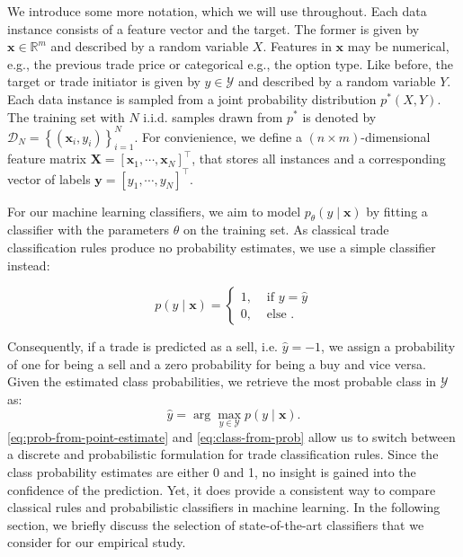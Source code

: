 We introduce some more notation, which we will use throughout. Each data instance consists of a feature vector and the target. The former is given by $\mathbf{x} \in \mathbb{R}^m$ and described by a random variable $X$. Features in $\mathbf{x}$ may be numerical, e.g., the previous trade price or categorical e.g., the option type. Like before, the target or trade initiator is given by $y \in \mathcal{Y}$ and described by a random variable $Y$. Each data instance is sampled from a joint probability distribution $p^*(X, Y)$. The training set with $N$ i.i.d. samples drawn from $p^*$ is denoted by $\mathcal{D}_N=\left\{\left(\mathbf{x}_i, y_i\right)\right\}_{i=1}^N$. For convienience, we define a $(n \times m)$-dimensional feature matrix $\mathbf{X}=\left[\mathbf{x}_1,\cdots, \mathbf{x}_N\right]^{\top}$, that stores all instances and a corresponding vector of labels $\mathbf{y}=\left[y_1,\cdots, y_N \right]^{\top}$.

For our machine learning classifiers, we aim to model $p_{\theta}(y \mid \mathbf{x})$ by fitting a classifier with the parameters $\theta$ on the training set. As classical trade classification rules produce no probability estimates, we use a simple classifier instead:

\begin{equation}
    p(y\mid \mathbf{x})= \begin{cases}1, & \text { if } y=\hat{y} \\ 0, & \text { else }.\end{cases}
    \label{eq:prob-from-point-estimate}
\end{equation}

Consequently, if a trade is predicted as a sell, i.e. $\hat{y} = -1$,  we assign a probability of one for being a sell and a zero probability for being a buy and vice versa. Given the estimated class probabilities, we retrieve the most probable class in $\mathcal{Y}$ as:
\begin{equation}
    \hat{y}=\arg\max_{y \in \mathcal{Y}} p(y \mid \mathbf{x}).
    \label{eq:class-from-prob}
\end{equation}
\cref{eq:prob-from-point-estimate} and \cref{eq:class-from-prob} allow us to switch between a discrete and probabilistic formulation for trade classification rules. Since the class probability estimates are either 0
and 1, no insight is gained into the confidence of the prediction. Yet, it does provide a consistent way to compare classical rules and probabilistic classifiers in machine learning. In the following section, we briefly discuss the selection of state-of-the-art classifiers that we consider for our empirical study.


